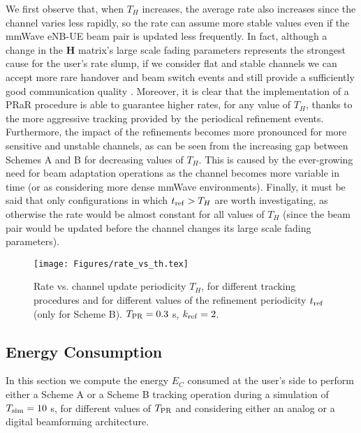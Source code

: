 \documentclass[conference]{IEEEtran}
\newlength\fheight
\newlength\fwidth
\newif\iftikz
\begin{document}
We first observe that, when $T_H$ increases, the average rate also increases since the
channel varies less rapidly, so the rate can assume more stable values even if the mmWave eNB-UE
beam pair is updated less frequently. 
In fact, although a change in the \textbf{H} matrix's large scale fading
parameters represents the strongest cause for the user's rate slump, if we consider flat and stable channels we can accept more rare handover and beam
switch events and still provide a sufficiently good communication quality \cite{giordani2016uplink}.
Moreover, it is clear that the implementation of a PRaR procedure is able to guarantee higher rates, for any value of $T_H$, thanks to the more aggressive tracking  provided by the periodical refinement events.
Furthermore, the impact of the refinements becomes more pronounced for more sensitive and unstable channels, as can be seen from the increasing gap between Schemes A and B for decreasing values of $T_H$.
This is caused by the ever-growing need for beam adaptation operations as the channel becomes more variable in time (or as considering more dense mmWave environments).
Finally, it must be said that only configurations in which ${t_{\rm ref} > T_{H} }$ are worth investigating, as otherwise the rate would be almost constant for all values of $T_H$
(since the beam pair would be updated before the channel  changes its large scale fading
parameters).

\begin{figure}[t!]
\centering
		\setlength{\belowcaptionskip}{0cm}
		\iftikz
		\setlength{\belowcaptionskip}{0cm}
		\setlength\fwidth{0.78\columnwidth}
		\setlength\fheight{0.43\columnwidth}
		
		\else
		\texttt{[image: Figures/rate\_vs\_th.tex]}
		\fi
		\caption{Rate vs. channel update periodicity $T_H$, for different tracking procedures and for different values of the refinement periodicity $t_{\rm ref}$ (only for Scheme B). $T_{\rm PR} = 0.3$ s, $k_{\rm ref}=2$. }
		\vspace{-1.2em}
			\label{fig:rate_vs_th}
	\end{figure}



\subsection{Energy Consumption}





In this section we compute the energy $E_C$ consumed at the user's side to perform either a Scheme A or a Scheme B tracking operation during a simulation of $T_{\rm sim}=10$ s, for different values of $T_{\rm PR}$ and considering either an analog or a digital beamforming architecture.
\end{document}
